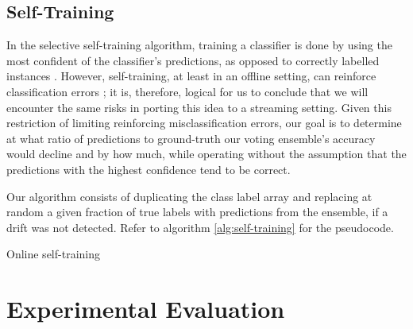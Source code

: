 \documentclass[runningheads]{llncs}
\begin{document}
\subsection{Self-Training}

In the selective self-training algorithm, training a classifier is done by using the most confident of the classifier's predictions, as opposed to correctly labelled instances \cite[15-19]{zhu2009selftraining}.
However, self-training, at least in an offline setting, can reinforce classification errors \cite[16]{zhu2009selftraining}; it is, therefore, logical for us to conclude that we will encounter the same risks in porting this idea to a streaming setting. Given this restriction of limiting reinforcing misclassification errors, our goal is to determine at what ratio of predictions to ground-truth our voting ensemble's accuracy would decline and by how much, while operating without the assumption that the predictions with the highest confidence tend to be correct.

Our algorithm consists of duplicating the class label array and replacing at random a given fraction of true labels with predictions from the ensemble, if a drift was not detected. Refer to algorithm \ref{alg:self-training} for the pseudocode.

\begin{algorithm}

\caption{\label{alg:self-training}Online self-training}
\end{algorithm}

\section{Experimental Evaluation\label{section:experimental_design}}
\end{document}
